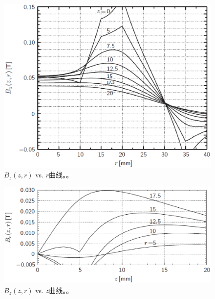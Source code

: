 \begin{figure}
	\centering
	\includegraphics[scale=0.5]{chpt9/figs/fig9.12.eps}
	\caption{$B_z(z,r)$ vs. $r$曲线。。}
\end{figure}

\begin{figure}
	\centering
	\includegraphics[scale=0.5]{chpt9/figs/fig9.13.eps}
	\caption{$B_z(z,r)$ vs. $z$曲线。。}
\end{figure}



